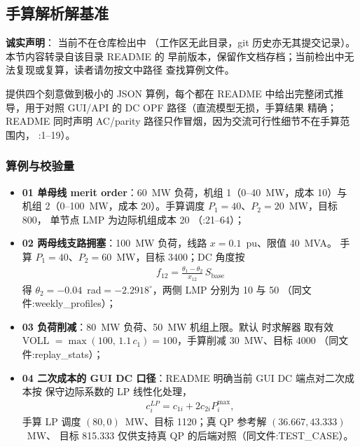 \subsection{手算解析解基准}\label{subsec:ver:hand}

\textbf{诚实声明}： 当前不在仓库检出中
（工作区无此目录，git 历史亦无其提交记录）。本节内容转录自该目录 README 的
早前版本，保留作文档存档；当前检出中无法复现或复算，读者请勿按文中路径
查找算例文件。

 提供四个刻意做到极小的 JSON 算例，每个都在
README 中给出完整闭式推导，用于对照 GUI/API 的 DC OPF 路径（直流模型无损，手算结果
精确；README 同时声明 AC/parity 路径只作冒烟，因为交流可行性细节不在手算范围内，
:1--19）。

\subsubsection*{算例与校验量}
\begin{itemize}
  \item \textbf{01 单母线 merit order}：60~MW 负荷，机组 1（0--40~MW，成本 10）与
        机组 2（0--100~MW，成本 20）。手算调度 $P_1=40$、$P_2=20$~MW，目标 800，
        单节点 LMP 为边际机组成本 20
        （:21--64）；
  \item \textbf{02 两母线支路拥塞}：100~MW 负荷，线路 $x=0.1$~pu、限值 40~MVA。
        手算 $P_1=40$、$P_2=60$~MW，目标 3400；DC 角度按
        \begin{align*}
        f_{12}=\frac{\theta_1-\theta_2}{x_{12}}\,S_{\mathrm{base}}
        \end{align*}
        得 $\theta_2=-0.04$~rad$=-2.2918^\circ$，两侧 LMP 分别为 10 与 50
        （同文件:weekly\_profiles）；
  \item \textbf{03 负荷削减}：80~MW 负荷、50~MW 机组上限。默认  时求解器
        取有效 VOLL $=\max(100,\,1.1\,c_1)=100$，手算削减 30~MW、目标 4000
        （同文件:replay\_stats）；
  \item \textbf{04 二次成本的 GUI DC 口径}：README 明确当前 GUI DC 端点对二次成本按
        保守边际系数的 LP 线性化处理，
        \begin{align*}
        c_i^{LP}=c_{1i}+2c_{2i}P_i^{\max},
        \end{align*}
        手算 LP 调度 $(80,0)$~MW、目标 1120；真 QP 参考解 $(36.667,43.333)$~MW、
        目标 815.333 仅供支持真 QP 的后端对照（同文件:TEST\_CASE）。
\end{itemize}

